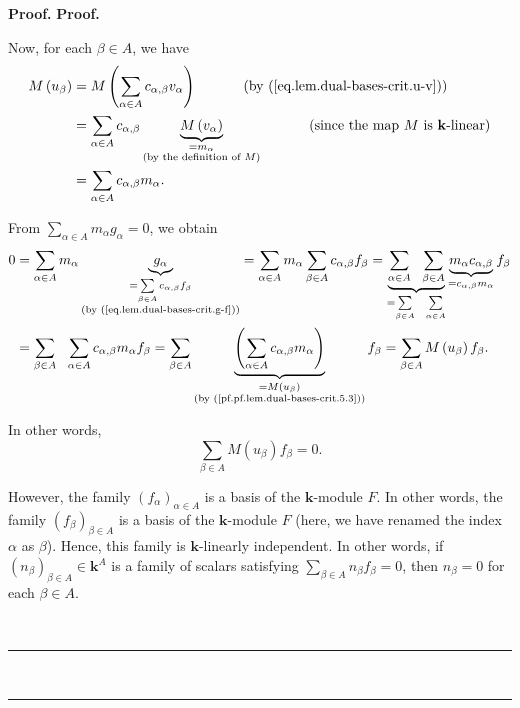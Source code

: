 \documentclass[numbers=enddot,12pt,final,onecolumn,notitlepage]{scrartcl}%
\theoremstyle{definition}
\newenvironment{proof}[1][Proof]{\noindent\textbf{#1.} }{\ \rule{0.5em}{0.5em}}
\let\sumnonlimits\sum
\renewcommand{\sum}{\sumnonlimits\limits}
\newenvironment{verlong}{}{}
\newenvironment{vershort}{}{}
\begin{document}
\begin{proof}
\begin{proof}
\begin{vershort}
\end{vershort}

\begin{verlong}
Now, for each $\beta\in A$, we have%
\begin{align}
M\left(  u_{\beta}\right)   &  =M\left(  \sum_{\alpha\in A}c_{\alpha,\beta
}v_{\alpha}\right)  \ \ \ \ \ \ \ \ \ \ \left(  \text{by
(\ref{eq.lem.dual-bases-crit.u-v})}\right) \nonumber\\
&  =\sum_{\alpha\in A}c_{\alpha,\beta}\underbrace{M\left(  v_{\alpha}\right)
}_{\substack{=m_{\alpha}\\\text{(by the definition of }M\text{)}%
}}\ \ \ \ \ \ \ \ \ \ \left(  \text{since the map }M\text{ is }\mathbf{k}%
\text{-linear}\right) \nonumber\\
&  =\sum_{\alpha\in A}c_{\alpha,\beta}m_{\alpha}.
\label{pf.pf.lem.dual-bases-crit.5.3}%
\end{align}


From $\sum_{\alpha\in A}m_{\alpha}g_{\alpha}=0$, we obtain%
\begin{align*}
0  &  =\sum_{\alpha\in A}m_{\alpha}\underbrace{g_{\alpha}}_{\substack{=\sum
_{\beta\in A}c_{\alpha,\beta}f_{\beta}\\\text{(by
(\ref{eq.lem.dual-bases-crit.g-f}))}}}=\sum_{\alpha\in A}m_{\alpha}\sum
_{\beta\in A}c_{\alpha,\beta}f_{\beta}=\underbrace{\sum_{\alpha\in A}%
\ \ \sum_{\beta\in A}}_{=\sum_{\beta\in A}\ \ \sum_{\alpha\in A}%
}\underbrace{m_{\alpha}c_{\alpha,\beta}}_{=c_{\alpha,\beta}m_{\alpha}}%
f_{\beta}\\
&  =\sum_{\beta\in A}\ \ \sum_{\alpha\in A}c_{\alpha,\beta}m_{\alpha}f_{\beta
}=\sum_{\beta\in A}\underbrace{\left(  \sum_{\alpha\in A}c_{\alpha,\beta
}m_{\alpha}\right)  }_{\substack{=M\left(  u_{\beta}\right)  \\\text{(by
(\ref{pf.pf.lem.dual-bases-crit.5.3}))}}}f_{\beta}=\sum_{\beta\in A}M\left(
u_{\beta}\right)  f_{\beta}.
\end{align*}

\end{verlong}

In other words,
\begin{equation}
\sum_{\beta\in A}M\left(  u_{\beta}\right)  f_{\beta}=0.
\label{pf.pf.lem.dual-bases-crit.5.1}%
\end{equation}


However, the family $\left(  f_{\alpha}\right)  _{\alpha\in A}$ is a basis of
the $\mathbf{k}$-module $F$. In other words, the family $\left(  f_{\beta
}\right)  _{\beta\in A}$ is a basis of the $\mathbf{k}$-module $F$ (here, we
have renamed the index $\alpha$ as $\beta$). Hence, this family is
$\mathbf{k}$-linearly independent. In other words, if $\left(  n_{\beta
}\right)  _{\beta\in A}\in\mathbf{k}^{A}$ is a family of scalars satisfying
$\sum_{\beta\in A}n_{\beta}f_{\beta}=0$, then $n_{\beta}=0$ for each $\beta\in
A$.


\end{proof}
\end{proof}
\end{document}
